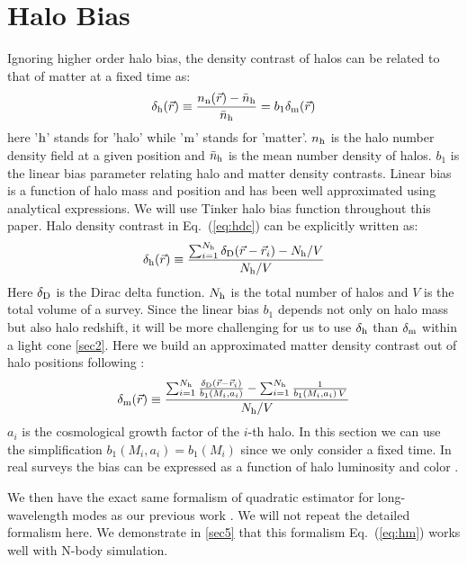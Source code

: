 \documentclass[prd,amsmath,amssymb,floatfix,superscriptaddress,nofootinbib,twocolumn]{revtex4-1}
\def\be{\begin{equation}}
\def\ee{\end{equation}}
\newcommand{\vrr}{\vec{r}}
\newcommand{\ec}[1]{Eq.~(\ref{eq:#1})}
\newcommand{\eql}[1]{\label{eq:#1}}
\begin{document}
\section{Halo Bias}
Ignoring higher order halo bias, the density contrast of halos can be related to that of matter at a fixed time as\cite{Bernardeau:2002rev}:
\be 
\delta_{\rm h}(\vrr) \equiv \frac{n_{\rm n}(\vrr)-\bar{n}_{\rm h}}{\bar{n}_{\rm h}}=b_{1}\delta_{\rm m}(\vrr) \eql{hdc}
\ee 
here '$\rm h$' stands for 'halo' while '$\rm m$' stands for 'matter'. $n_{\rm h}$ is the halo number density field at a given position and $\bar{n}_{\rm h}$ is the mean number density of halos. $b_{1}$ is the linear bias parameter relating halo and matter density contrasts. Linear bias is a function of halo mass and position and has been well approximated using analytical expressions\cite{Seljak:2004SW}\cite{Bhattacharya:2011MF}. We will use Tinker halo bias function throughout this paper\cite{Tinker:2010Tinker}. Halo density contrast in \ec{hdc} can be explicitly written as:
\be 
\delta_{\rm h}(\vrr) \equiv \frac{\sum_{i=1}^{N_{\rm h}}\delta_{\rm D}(\vrr-\vrr_{i})-N_{\rm h}/V}{N_{\rm h}/V}
\ee 
Here $\delta_{\rm D}$ is the Dirac delta function. $N_{\rm h}$ is the total number of halos and $V$ is the total volume of a survey. Since the linear bias $b_1$ depends not only on halo mass but also halo redshift, it will be more challenging for us to use $\delta_{\rm h}$ than $\delta_{\rm m}$ within a light cone \ref{sec2}. Here we build an approximated matter density contrast out of halo positions following \cite{Pervical:2007GPS}:
\be 
\delta_{\rm m}(\vrr) \equiv \frac{\sum_{i=1}^{N_{\rm h}}\frac{\delta_{\rm D}(\vrr-\vrr_{i})}{b_{1}(M_{i},a_{i})}-\sum_{i=1}^{N_{\rm h}}\frac{1}{b_{1}(M_{i},a_{i})\,V}}{N_{\rm h}/V} \eql{hm}
\ee 
$a_{i}$ is the cosmological growth factor of the $i$-th halo. In this section we can use the simplification $b_{1}(M_{i},a_{i})=b_{1}(M_i)$ since we only consider a fixed time. In real surveys the bias can be expressed as a function of halo luminosity and color \cite{Cresswell:2008Col}. 

We then have the exact same formalism of quadratic estimator for long-wavelength modes as our previous work \cite{Li:2020fir}. We will not repeat the detailed formalism here. We demonstrate in \ref{sec5} that this formalism \ec{hm} works well with N-body simulation.
 
\end{document}
